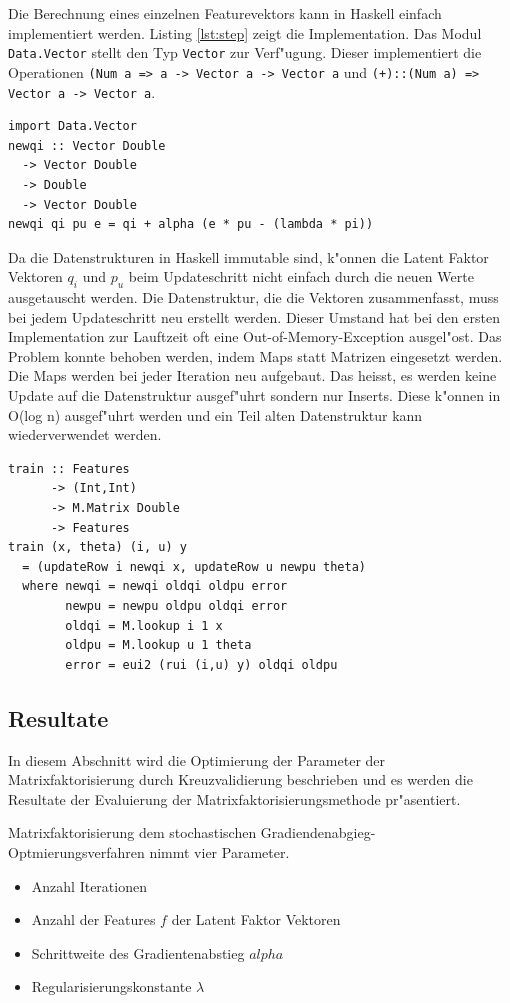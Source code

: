 \documentclass[a4paper, 12pt]{article}
\begin{document}
Die Berechnung eines einzelnen Featurevektors kann in Haskell einfach implementiert werden. Listing \ref{lst:step} zeigt die Implementation. Das Modul \verb|Data.Vector| stellt den Typ \verb|Vector| zur Verf"ugung. Dieser implementiert die Operationen \verb|(Num a => a -> Vector a -> Vector a| und \verb|(+)::(Num a) => Vector a -> Vector a|.

\begin{lstlisting}[caption=Berechnung eines Featurevektors, label={lst:step}]
import Data.Vector 
newqi :: Vector Double
  -> Vector Double
  -> Double
  -> Vector Double
newqi qi pu e = qi + alpha (e * pu - (lambda * pi))
\end{lstlisting}

Da die Datenstrukturen in Haskell immutable sind, k"onnen die Latent Faktor Vektoren $q_i$ und $p_u$ beim Updateschritt nicht einfach durch die neuen Werte ausgetauscht werden. Die Datenstruktur, die die Vektoren zusammenfasst, muss bei jedem Updateschritt neu erstellt werden. Dieser Umstand hat bei den ersten Implementation zur Lauftzeit oft eine Out-of-Memory-Exception ausgel"ost. Das Problem konnte behoben werden, indem Maps statt Matrizen eingesetzt werden. Die Maps werden bei jeder Iteration neu aufgebaut. Das heisst, es werden keine Update auf die Datenstruktur ausgef"uhrt sondern nur Inserts. Diese k"onnen in O(log n) ausgef"uhrt werden und ein Teil alten Datenstruktur kann wiederverwendet werden.

\begin{lstlisting}[caption=Implementation Funk SGD, label=lst:sgd] 
train :: Features
      -> (Int,Int) 
      -> M.Matrix Double 
      -> Features
train (x, theta) (i, u) y
  = (updateRow i newqi x, updateRow u newpu theta)
  where newqi = newqi oldqi oldpu error
        newpu = newpu oldpu oldqi error
        oldqi = M.lookup i 1 x
        oldpu = M.lookup u 1 theta
        error = eui2 (rui (i,u) y) oldqi oldpu  
\end{lstlisting}

\subsection{Resultate}
\label{sec:matrixfactorresults}
In diesem Abschnitt wird die Optimierung der Parameter der Matrixfaktorisierung durch Kreuzvalidierung beschrieben und es werden die Resultate der Evaluierung der Matrixfaktorisierungsmethode pr"asentiert. 

Matrixfaktorisierung dem stochastischen Gradiendenabgieg-Optmierungsverfahren  nimmt vier Parameter.
\begin{itemize}
\item Anzahl Iterationen
\item Anzahl der Features $f$ der Latent Faktor Vektoren
\item Schrittweite des Gradientenabstieg $alpha$
\item Regularisierungskonstante $\lambda$
\end{itemize}
\end{document}
